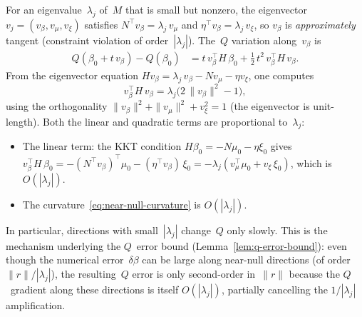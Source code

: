 \begin{remark}%
\label{rem:near-null-q}
For an eigenvalue~$\lambda_j$ of~$M$ that is
small but nonzero, the eigenvector
$v_j = (v_\beta, v_\mu, v_\xi)$ satisfies
$N^\top v_\beta = \lambda_j\,v_\mu$ and
$\eta^\top v_\beta = \lambda_j\,v_\xi$,
so $v_\beta$ is \emph{approximately} tangent
(constraint violation of order~$|\lambda_j|$).
The~$Q$ variation along~$v_\beta$ is
\begin{align*}
  Q(\beta_0 + t\,v_\beta) - Q(\beta_0)
  &= t\,v_\beta^\top H\,\beta_0
    + \tfrac{1}{2}\,t^2\,v_\beta^\top H\,v_\beta.
\end{align*}
From the eigenvector equation
$Hv_\beta = \lambda_j\,v_\beta
  - N v_\mu - \eta v_\xi$,
one computes
\begin{equation}\label{eq:near-null-curvature}
  v_\beta^\top H\,v_\beta
  = \lambda_j\bigl(2\,\|v_\beta\|^2 - 1\bigr),
\end{equation}
using the orthogonality
$\|v_\beta\|^2 + \|v_\mu\|^2 + v_\xi^2 = 1$
(the eigenvector is unit-length).
Both the linear and quadratic terms are
proportional to~$\lambda_j$:
\begin{itemize}
\item The linear term:
  the KKT condition
  $H\beta_0 = -N\mu_0 - \eta\xi_0$ gives
  $v_\beta^\top H\,\beta_0
    = -(N^\top v_\beta)^\top\mu_0
      - (\eta^\top v_\beta)\,\xi_0
    = -\lambda_j(v_\mu^\top\mu_0
      + v_\xi\,\xi_0)$,
  which is $O(|\lambda_j|)$.
\item The curvature~\eqref{eq:near-null-curvature}
  is $O(|\lambda_j|)$.
\end{itemize}
In particular, directions with small~$|\lambda_j|$
change~$Q$ only slowly.
This is the mechanism underlying the $Q$~error bound
(Lemma~\ref{lem:q-error-bound}): even though the
numerical error~$\delta\beta$ can be large along
near-null directions (of order~$\|r\| / |\lambda_j|$),
the resulting~$Q$ error is only second-order in~$\|r\|$
because the $Q$~gradient along these directions
is itself $O(|\lambda_j|)$,
partially cancelling the $1/|\lambda_j|$ amplification.
\end{remark}

